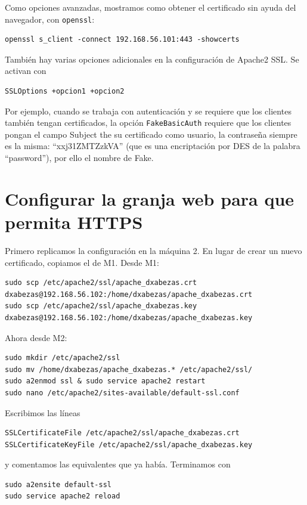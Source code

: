 \documentclass{article}
\begin{document}
Como opciones avanzadas, mostramos como obtener el certificado sin ayuda del navegador, con \texttt{openssl}:
\begin{Verbatim}[tabsize=4]
openssl s_client -connect 192.168.56.101:443 -showcerts
\end{Verbatim}

También hay varias opciones adicionales en la configuración de Apache2 SSL. Se activan con
\begin{Verbatim}[tabsize=4]
SSLOptions +opcion1 +opcion2
\end{Verbatim}

Por ejemplo, cuando se trabaja con autenticación y se requiere que los clientes también tengan certificados, la opción
\texttt{FakeBasicAuth} requiere que los clientes pongan el campo Subject the su certificado como usuario, la contraseña siempre
es la misma: ``xxj31ZMTZzkVA'' (que es una encriptación por DES de la palabra ``password''), por ello el nombre de Fake.

\section{Configurar la granja web para que permita HTTPS}

Primero replicamos la configuración en la máquina 2. En lugar de crear un nuevo certificado, copiamos el de M1.
Desde M1:
\begin{Verbatim}
sudo scp /etc/apache2/ssl/apache_dxabezas.crt dxabezas@192.168.56.102:/home/dxabezas/apache_dxabezas.crt
sudo scp /etc/apache2/ssl/apache_dxabezas.key dxabezas@192.168.56.102:/home/dxabezas/apache_dxabezas.key
\end{Verbatim}

Ahora desde M2:
\begin{Verbatim}
sudo mkdir /etc/apache2/ssl
sudo mv /home/dxabezas/apache_dxabezas.* /etc/apache2/ssl/
sudo a2enmod ssl & sudo service apache2 restart
sudo nano /etc/apache2/sites-available/default-ssl.conf
\end{Verbatim}

Escribimos las líneas 
\begin{Verbatim}
SSLCertificateFile /etc/apache2/ssl/apache_dxabezas.crt
SSLCertificateKeyFile /etc/apache2/ssl/apache_dxabezas.key
\end{Verbatim}
y comentamos las equivalentes que ya había. Terminamos con 
\begin{Verbatim}[tabsize=4]
sudo a2ensite default-ssl
sudo service apache2 reload
\end{Verbatim}
\end{document}
